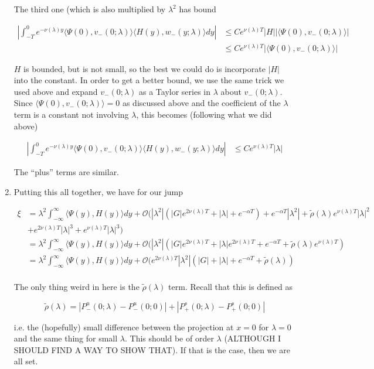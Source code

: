 \documentclass[12pt]{article}
\begin{document}
\begin{enumerate}
The third one (which is also multiplied by $\lambda^2$ has bound

\begin{align*}
\left| \int_{-T}^0 e^{-\nu(\lambda)y} \langle \Psi(0), v_-(0; \lambda) \rangle
\langle H(y), w_-(y; \lambda) \rangle dy \right| 
&\leq C e^{\nu(\lambda)T} |H| |\langle \Psi(0), v_-(0; \lambda) \rangle| \\
&\leq C e^{\nu(\lambda)T} |\langle \Psi(0), v_-(0; \lambda) \rangle|
\end{align*}

$H$ is bounded, but is not small, so the best we could do is incorporate $|H|$ into the constant. In order to get a better bound, we use the same trick we used above and expand $v_-(0; \lambda)$ as a Taylor series in $\lambda$ about $v_-(0; \lambda)$. Since $\langle \Psi(0), v_-(0; \lambda) \rangle = 0$ as discussed above and the coefficient of the $\lambda$ term is a constant not involving $\lambda$, this becomes (following what we did above)

\begin{align*}
\left| \int_{-T}^0 e^{-\nu(\lambda)y} \langle \Psi(0), v_-(0; \lambda) \rangle
\langle H(y), w_-(y; \lambda) \rangle dy \right|
&\leq C e^{\nu(\lambda)T} |\lambda|
\end{align*}

The ``plus'' terms are similar.

\item Putting this all together, we have for our jump

\begin{align*}
\xi &= \lambda^2 \int_{-\infty}^\infty \langle \Psi(y), H(y) \rangle dy + \mathcal{O}( |\lambda^2|(|G| e^{2 \nu(\lambda)T} + |\lambda|+ e^{-\alpha T}) + e^{-\alpha T} |\lambda^2| + \tilde{\rho}(\lambda) e^{\nu(\lambda)T}|\lambda|^2\\
&+ e^{2 \nu(\lambda)T}|\lambda|^3 + e^{\nu(\lambda)T} |\lambda|^3) \\
&= \lambda^2 \int_{-\infty}^\infty \langle \Psi(y), H(y) \rangle dy + \mathcal{O}( |\lambda^2|(|G| e^{2 \nu(\lambda)T} + |\lambda|e^{2 \nu(\lambda)T} + e^{-\alpha T} + \tilde{\rho}(\lambda) e^{\nu(\lambda)T} )\\
&= \lambda^2 \int_{-\infty}^\infty \langle \Psi(y), H(y) \rangle dy + \mathcal{O}( e^{2 \nu(\lambda)T} |\lambda^2|(|G| + |\lambda| + e^{-\alpha T} + \tilde{\rho}(\lambda) )\\
\end{align*}

The only thing weird in here is the $\tilde{\rho}(\lambda)$ term. Recall that this is defined as 

\[
\tilde{\rho}(\lambda) = |P^u_-(0;\lambda) - P^u_-(0; 0)| + |P^s_+(0;\lambda) - P^s_+(0;0)|
\]

i.e. the (hopefully) small difference between the projection at $x = 0$ for $\lambda = 0$ and the same thing for small $\lambda$. This should be of order $\lambda$ (ALTHOUGH I SHOULD FIND A WAY TO SHOW THAT). If that is the case, then we are all set.

\end{enumerate}
\end{document}

